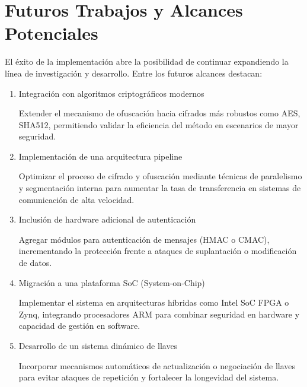 \clearpage

\section{Futuros Trabajos y Alcances Potenciales}

El éxito de la implementación abre la posibilidad de continuar expandiendo la línea de investigación y desarrollo. Entre los futuros alcances destacan:
\begin{enumerate}
\item Integración con algoritmos criptográficos modernos

Extender el mecanismo de ofuscación hacia cifrados más robustos como AES, SHA512, permitiendo validar la eficiencia del método en escenarios de mayor seguridad.

\item Implementación de una arquitectura pipeline

Optimizar el proceso de cifrado y ofuscación mediante técnicas de paralelismo y segmentación interna para aumentar la tasa de transferencia en sistemas de comunicación de alta velocidad.

\item Inclusión de hardware adicional de autenticación

Agregar módulos para autenticación de mensajes (HMAC o CMAC), incrementando la protección frente a ataques de suplantación o modificación de datos.


\item Migración a una plataforma SoC (System-on-Chip)

Implementar el sistema en arquitecturas híbridas como Intel SoC FPGA o Zynq, integrando procesadores ARM para combinar seguridad en hardware y capacidad de gestión en software.

\item Desarrollo de un sistema dinámico de llaves

Incorporar mecanismos automáticos de actualización o negociación de llaves para evitar ataques de repetición y fortalecer la longevidad del sistema.

\end{enumerate}

%

